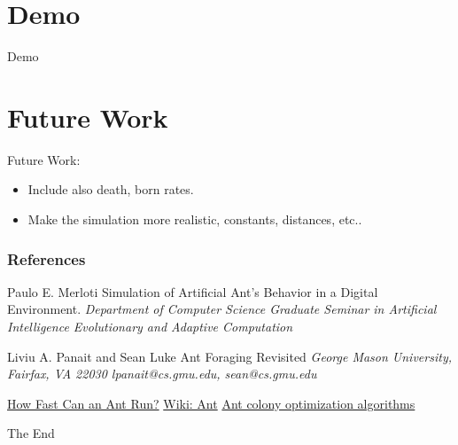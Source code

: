 \documentclass{beamer}
\begin{document}
\section{Demo}
\begin{frame}
\Huge{\centerline{Demo}}
\end{frame}

\section{Future Work}
\begin{frame}
Future Work:
\begin{itemize}
\item Include also death, born rates.
\item Make the simulation more realistic, constants, distances, etc..
\end{itemize}
\end{frame}


\begin{frame}
\frametitle{References}
\footnotesize{
\begin{thebibliography}{99} %
 Paulo E. Merloti
\newblock Simulation of Artificial Ant’s Behavior 
in a Digital Environment.
\newblock \emph{Department of Computer Science 
Graduate Seminar in Artificial Intelligence 
Evolutionary and Adaptive Computation 
}

 Liviu A. Panait and Sean Luke
\newblock Ant Foraging Revisited
\newblock \emph{George Mason University, Fairfax, VA 22030
lpanait@cs.gmu.edu, sean@cs.gmu.edu
}




\href{http://www.ehow.com/about_5365350_fast-can-ant-run.html}{How Fast Can an Ant Run?}
\href{http://en.wikipedia.org/wiki/Ant}{Wiki: Ant}
\href{http://en.wikipedia.org/wiki/Ant_colony_optimization_algorithms}{Ant colony optimization algorithms}

\end{thebibliography}
}
\end{frame}


\begin{frame}
\Huge{\centerline{The End}}
\end{frame}

\end{document}
